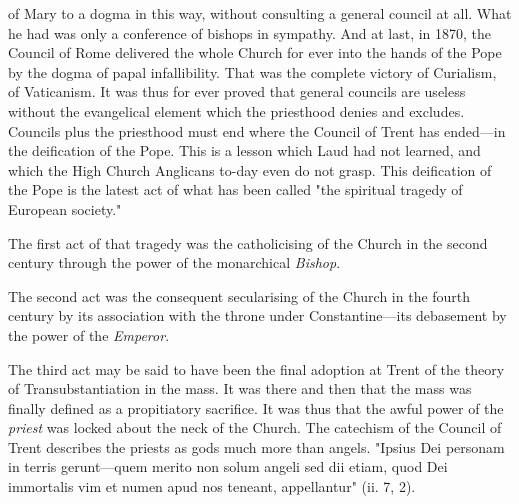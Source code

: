 \documentclass[12pt,a5paper,twoside]{book}
\begin{document}
of Mary to a dogma in this way, without consulting 
a general council at all. What he had was only 
a conference of bishops in sympathy. And at last, in 
1870, the Council of Rome delivered the whole 
Church for ever into the hands of the Pope by the 
dogma of papal infallibility. That was the complete 
victory of Curialism, of Vaticanism. It was thus for 
ever proved that general councils are useless without 
the evangelical element which the priesthood denies 
and excludes. Councils plus the priesthood must end 
where the Council of Trent has ended---in the deification
of the Pope. This is a lesson which Laud 
had not learned, and which the High Church Anglicans 
to-day even do not grasp. This deification of 
the Pope is the latest act of what has been called 
"the spiritual tragedy of European society." 

The first act of that tragedy was the catholicising 
of the Church in the second century through the 
power of the monarchical \textit{Bishop}. 

The second act was the consequent secularising of 
the Church in the fourth century by its association 
with the throne under Constantine---its debasement 
by the power of the \textit{Emperor}. 

The third act may be said to have been the final 
adoption at Trent of the theory of Transubstantiation 
in the mass. It was there and then that the 
mass was finally defined as a propitiatory sacrifice. 
It was thus that the awful power of the \textit{priest} was 
locked about the neck of the Church. The catechism 
of the Council of Trent describes the priests as 
gods much more than angels. "Ipsius Dei personam 
in terris gerunt---quem merito non solum angeli sed 
dii etiam, quod Dei immortalis vim et numen apud 
nos teneant, appellantur" (ii. 7, 2). 
\end{document}
